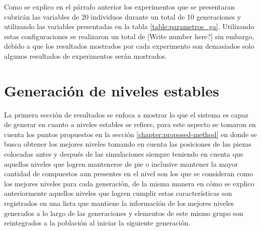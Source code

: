 Como se explico en el párrafo anterior los experimentos que se presentaran
cubrirán las variables de 20 individuos durante un total de 10 generaciones y
utilizando las variables presentadas en la tabla \ref{table:parametros_ga}.
Utilizando estas configuraciones se realizaron un total de [Write number here?]
sin embargo, debido a que los resultados mostrados por cada experimento son
demasiados solo algunos resultados de experimentos serán mostrados.

\section{Generación de niveles estables}
\label{section:chap6_stable_level_generation}

La primera sección de resultados se enfoca a mostrar lo que el sistema es capaz
de generar en cuanto a niveles estables se refiere, para este aspecto se tomaron
en cuenta los puntos propuestos en la sección \ref{chapter:proposed-method} en
donde se busca obtener los mejores niveles tomando en cuenta las posiciones de
las piezas colocadas antes y después de las simulaciones siempre teniendo en
cuenta que aquellos niveles que logren mantenerse de pie o inclusive mantener la
mayor cantidad de compuestos aun presentes en el nivel son los que se consideran
como los mejores niveles para cada generación, de la misma manera en cómo se
explico anteriormente aquellos niveles que logren cumplir estas características
son registrados en una lista que mantiene la información de los mejores niveles
generados a lo largo de las generaciones y elementos de este mismo grupo son
reintegrados a la población al iniciar la siguiente generación.

